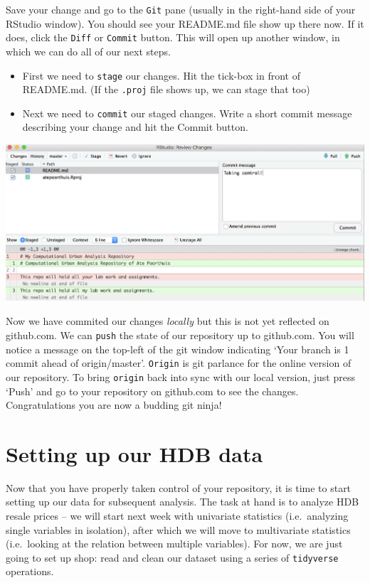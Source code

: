 \documentclass[]{book}
\providecommand{\tightlist}{%
  \setlength{\itemsep}{0pt}\setlength{\parskip}{0pt}}
\begin{document}
Save your change and go to the \texttt{Git} pane (usually in the right-hand side of your RStudio window). You should see your README.md file show up there now. If it does, click the \texttt{Diff} or \texttt{Commit} button. This will open up another window, in which we can do all of our next steps.

\begin{itemize}
\tightlist
\item
  First we need to \texttt{stage} our changes. Hit the tick-box in front of README.md. (If the \texttt{.proj} file shows up, we can stage that too)
\item
  Next we need to \texttt{commit} our staged changes. Write a short commit message describing your change and hit the Commit button.
\end{itemize}

\includegraphics{images/commit.png}

Now we have commited our changes \emph{locally} but this is not yet reflected on github.com. We can \texttt{push} the state of our repository up to github.com. You will notice a message on the top-left of the git window indicating `Your branch is 1 commit ahead of origin/master'. \texttt{Origin} is git parlance for the online version of our repository. To bring \texttt{origin} back into sync with our local version, just press `Push' and go to your repository on github.com to see the changes. Congratulations you are now a budding git ninja!

\hypertarget{setting-up-our-hdb-data}{%
\section{Setting up our HDB data}\label{setting-up-our-hdb-data}}

Now that you have properly taken control of your repository, it is time to start setting up our data for subsequent analysis. The task at hand is to analyze HDB resale prices -- we will start next week with univariate statistics (i.e.~analyzing single variables in isolation), after which we will move to multivariate statistics (i.e.~looking at the relation between multiple variables). For now, we are just going to set up shop: read and clean our dataset using a series of \texttt{tidyverse} operations.
\end{document}
